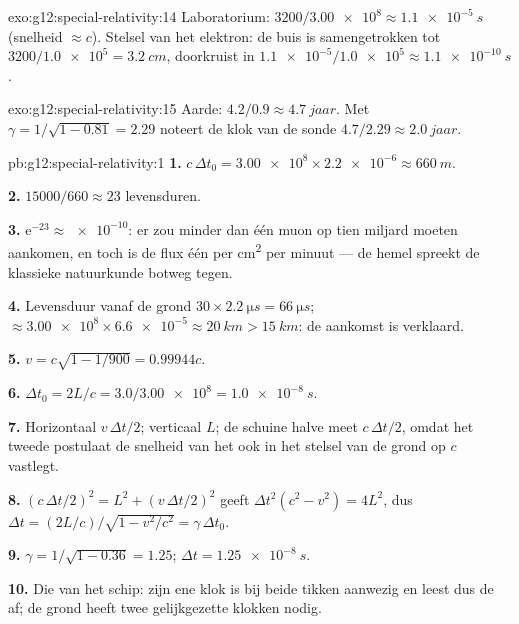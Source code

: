 \begin{solution}{exo:g12:special-relativity:14}
Laboratorium: $3200/\num{3.00e8} \approx \qty{1.1e-5}{s}$ (snelheid
$\approx c$). Stelsel van het elektron: de buis is samengetrokken tot
$3200/\num{1.0e5} = \qty{3.2}{cm}$, doorkruist in
$\num{1.1e-5}/\num{1.0e5} \approx \qty{1.1e-10}{s}$.
\end{solution}

\begin{solution}{exo:g12:special-relativity:15}
Aarde: $4.2/0.9 \approx \qty{4.7}{jaar}$. Met
$\gamma = 1/\sqrt{1 - 0.81} = 2.29$ noteert de klok van de sonde
$4.7/2.29 \approx \qty{2.0}{jaar}$.
\end{solution}

\begin{solution}{pb:g12:special-relativity:1}
\textbf{1.} $c\,\Delta t_0 = \num{3.00e8} \times \num{2.2e-6} \approx
\qty{660}{m}$.

\textbf{2.} $\num{15000}/660 \approx 23$ levensduren.

\textbf{3.} $\mathrm{e}^{-23} \approx \num{e-10}$: er zou minder dan één muon
op tien miljard moeten aankomen, en toch is de flux één per \unit{cm^2} per
minuut --- de hemel spreekt de klassieke natuurkunde botweg tegen.

\textbf{4.} Levensduur vanaf de grond $30 \times \qty{2.2}{\micro s} =
\qty{66}{\micro s}$;  $\approx \num{3.00e8} \times \num{6.6e-5}
\approx \qty{20}{km} > \qty{15}{km}$: de aankomst is verklaard.

\textbf{5.} $v = c\sqrt{1 - 1/900} = 0.99944c$.

\textbf{6.} $\Delta t_0 = 2L/c = 3.0/\num{3.00e8} = \qty{1.0e-8}{s}$.

\textbf{7.} Horizontaal $v\,\Delta t/2$; verticaal $L$; de schuine halve 
meet $c\,\Delta t/2$, omdat het tweede postulaat de snelheid van het  ook
in het stelsel van de grond op $c$ vastlegt.

\textbf{8.} $(c\,\Delta t/2)^2 = L^2 + (v\,\Delta t/2)^2$ geeft
$\Delta t^2(c^2 - v^2) = 4L^2$, dus $\Delta t =
(2L/c)/\sqrt{1 - v^2/c^2} = \gamma\,\Delta t_0$.

\textbf{9.} $\gamma = 1/\sqrt{1 - 0.36} = 1.25$;
$\Delta t = \qty{1.25e-8}{s}$.

\textbf{10.} Die van het schip: zijn ene klok is bij beide tikken aanwezig en
leest dus de  af; de grond heeft twee gelijkgezette klokken nodig.


\end{solution}
